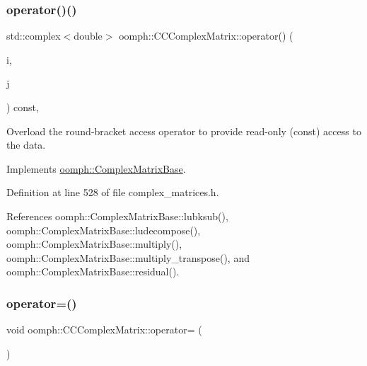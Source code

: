 \mbox{\label{classoomph_1_1CCComplexMatrix_a09035e7b3fc0346ed91f4ddff4bebc13}} 
\subsubsection{\texorpdfstring{operator()()}{operator()()}}
{\footnotesize\ttfamily std\+::complex$<$double$>$ oomph\+::\+C\+C\+Complex\+Matrix\+::operator() (\begin{DoxyParamCaption}\item[{const unsigned long \&}]{i,  }\item[{const unsigned long \&}]{j }\end{DoxyParamCaption}) const\hspace{0.3cm}{\ttfamily [inline]}, {\ttfamily [virtual]}}



Overload the round-\/bracket access operator to provide read-\/only (const) access to the data. 



Implements \hyperlink{classoomph_1_1ComplexMatrixBase_a78d1185ec8249fec5855d01129a1c870}{oomph\+::\+Complex\+Matrix\+Base}.



Definition at line 528 of file complex\+\_\+matrices.\+h.



References oomph\+::\+Complex\+Matrix\+Base\+::lubksub(), oomph\+::\+Complex\+Matrix\+Base\+::ludecompose(), oomph\+::\+Complex\+Matrix\+Base\+::multiply(), oomph\+::\+Complex\+Matrix\+Base\+::multiply\+\_\+transpose(), and oomph\+::\+Complex\+Matrix\+Base\+::residual().

\mbox{\label{classoomph_1_1CCComplexMatrix_a95c58231d17ca240a62f9398118cd433}} 
\subsubsection{\texorpdfstring{operator=()}{operator=()}}
{\footnotesize\ttfamily void oomph\+::\+C\+C\+Complex\+Matrix\+::operator= (\begin{DoxyParamCaption}\item[{const \hyperlink{classoomph_1_1CCComplexMatrix}{C\+C\+Complex\+Matrix} \&}]{ }\end{DoxyParamCaption})\hspace{0.3cm}{\ttfamily [inline]}}



